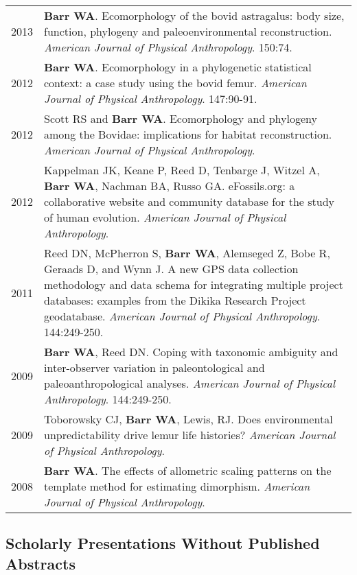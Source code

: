 \documentclass{article}
\begin{document}
\begin{longtable}{p{}p{}}
2013 & {\bfseries Barr WA}. Ecomorphology of the bovid astragalus: body size, function, phylogeny and paleoenvironmental reconstruction. \emph{American Journal of Physical Anthropology}. 150:74.\\[4pt]

2012 & {\bfseries Barr WA}. Ecomorphology in a phylogenetic statistical context: a case study using the bovid femur. \emph{American Journal of Physical Anthropology}. 147:90-91.\\[4pt]

2012 & Scott RS and {\bfseries Barr WA}. Ecomorphology and phylogeny among the Bovidae: implications for habitat reconstruction. \emph{American Journal of Physical Anthropology}.\\[4pt]

2012 & Kappelman JK, Keane P, Reed D, Tenbarge J, Witzel A, {\bfseries Barr WA}, Nachman BA, Russo GA. eFossils.org: a collaborative website and community database for the study of human evolution. \emph{American Journal of Physical Anthropology}.\\[4pt]

2011 & Reed DN, McPherron S, {\bfseries Barr WA}, Alemseged Z, Bobe R, Geraads D, and Wynn J. A new GPS data collection methodology and data schema for integrating multiple project databases: examples from the Dikika Research Project geodatabase. \emph{American Journal of Physical Anthropology}. 144:249-250.\\[4pt]

2009 & {\bfseries Barr WA}, Reed DN. Coping with taxonomic ambiguity and inter-observer variation in paleontological and paleoanthropological analyses. \emph{American Journal of Physical Anthropology}. 144:249-250.\\[4pt]

2009 & Toborowsky CJ, {\bfseries Barr WA}, Lewis, RJ. Does environmental unpredictability drive lemur life histories? \emph{American Journal of Physical Anthropology}.\\[4pt]

2008 & {\bfseries Barr WA}. The effects of allometric scaling patterns on the template method for estimating dimorphism. \emph{American Journal of Physical Anthropology}.\\
\end{longtable}

\subsection*{Scholarly Presentations Without Published Abstracts}
\end{document}
